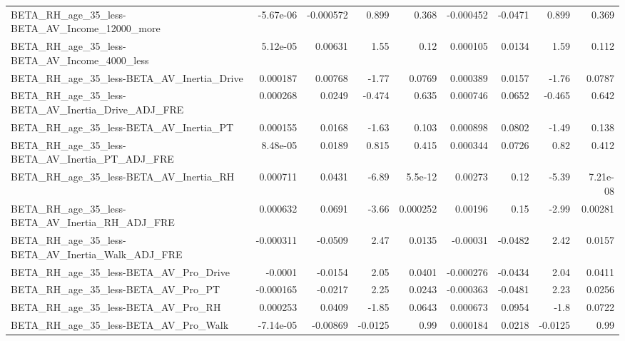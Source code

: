 \begin{tabular}{lrrrrrrrr}
BETA\_RH\_age\_35\_less-BETA\_AV\_Income\_12000\_more      &   -5.67e-06 &    -0.000572 &    0.899 &    0.368 &  -0.000452 &     -0.0471 &        0.899 &         0.369 \\
BETA\_RH\_age\_35\_less-BETA\_AV\_Income\_4000\_less       &    5.12e-05 &      0.00631 &     1.55 &     0.12 &   0.000105 &      0.0134 &         1.59 &         0.112 \\
BETA\_RH\_age\_35\_less-BETA\_AV\_Inertia\_Drive          &    0.000187 &      0.00768 &    -1.77 &   0.0769 &   0.000389 &      0.0157 &        -1.76 &        0.0787 \\
BETA\_RH\_age\_35\_less-BETA\_AV\_Inertia\_Drive\_ADJ\_FRE  &    0.000268 &       0.0249 &   -0.474 &    0.635 &   0.000746 &      0.0652 &       -0.465 &         0.642 \\
BETA\_RH\_age\_35\_less-BETA\_AV\_Inertia\_PT             &    0.000155 &       0.0168 &    -1.63 &    0.103 &   0.000898 &      0.0802 &        -1.49 &         0.138 \\
BETA\_RH\_age\_35\_less-BETA\_AV\_Inertia\_PT\_ADJ\_FRE     &    8.48e-05 &       0.0189 &    0.815 &    0.415 &   0.000344 &      0.0726 &         0.82 &         0.412 \\
BETA\_RH\_age\_35\_less-BETA\_AV\_Inertia\_RH             &    0.000711 &       0.0431 &    -6.89 &  5.5e-12 &    0.00273 &        0.12 &        -5.39 &      7.21e-08 \\
BETA\_RH\_age\_35\_less-BETA\_AV\_Inertia\_RH\_ADJ\_FRE     &    0.000632 &       0.0691 &    -3.66 & 0.000252 &    0.00196 &        0.15 &        -2.99 &       0.00281 \\
BETA\_RH\_age\_35\_less-BETA\_AV\_Inertia\_Walk\_ADJ\_FRE   &   -0.000311 &      -0.0509 &     2.47 &   0.0135 &   -0.00031 &     -0.0482 &         2.42 &        0.0157 \\
BETA\_RH\_age\_35\_less-BETA\_AV\_Pro\_Drive              &     -0.0001 &      -0.0154 &     2.05 &   0.0401 &  -0.000276 &     -0.0434 &         2.04 &        0.0411 \\
BETA\_RH\_age\_35\_less-BETA\_AV\_Pro\_PT                 &   -0.000165 &      -0.0217 &     2.25 &   0.0243 &  -0.000363 &     -0.0481 &         2.23 &        0.0256 \\
BETA\_RH\_age\_35\_less-BETA\_AV\_Pro\_RH                 &    0.000253 &       0.0409 &    -1.85 &   0.0643 &   0.000673 &      0.0954 &         -1.8 &        0.0722 \\
BETA\_RH\_age\_35\_less-BETA\_AV\_Pro\_Walk               &   -7.14e-05 &     -0.00869 &  -0.0125 &     0.99 &   0.000184 &      0.0218 &      -0.0125 &          0.99 \\

\end{tabular}
